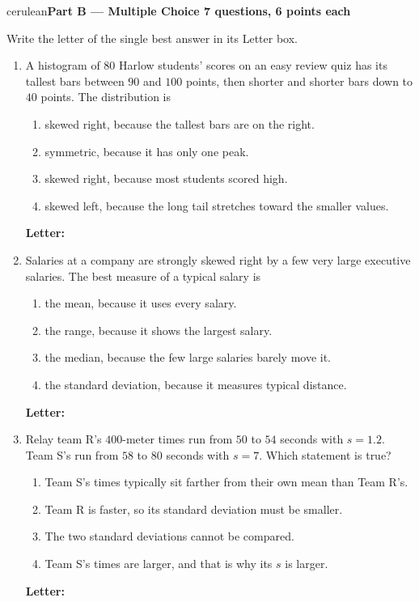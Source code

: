 \documentclass[10pt]{article}
\newcommand{\parthead}[1]{%
  \vspace{6pt}\noindent
  {\tcbset{after={\par\nopagebreak}}%
   \begin{headlinebox}{cerulean}{\color{white}\bfseries #1}\end{headlinebox}}%
  \nopagebreak\vspace{4pt}}
\begin{document}
\boxguard[8]
\parthead{Part B --- Multiple Choice \hfill 7 questions, 6 points each}

\small
Write the letter of the single best answer in its Letter box.
\begin{enumerate}[leftmargin=2.2em, itemsep=5pt, topsep=2pt, start=6]

\boxguard[9]
\item A histogram of $80$ Harlow students' scores on an easy review quiz has its tallest bars
between $90$ and $100$ points, then shorter and shorter bars down to $40$ points. The
distribution is
\begin{enumerate}[label=(\Alph*), leftmargin=1.8em, itemsep=1pt, topsep=1pt]
  \item skewed right, because the tallest bars are on the right.
  \item symmetric, because it has only one peak.
  \item skewed right, because most students scored high.
  \item skewed left, because the long tail stretches toward the smaller values.
\end{enumerate}
\hfill \textbf{Letter:} \gradedblank[id=q6, type=choice, points=6, answer={D}]{0.9cm}{11pt}

\boxguard[9]
\item Salaries at a company are strongly skewed right by a few very large executive salaries.
The best measure of a typical salary is
\begin{enumerate}[label=(\Alph*), leftmargin=1.8em, itemsep=1pt, topsep=1pt]
  \item the mean, because it uses every salary.
  \item the range, because it shows the largest salary.
  \item the median, because the few large salaries barely move it.
  \item the standard deviation, because it measures typical distance.
\end{enumerate}
\hfill \textbf{Letter:} \gradedblank[id=q7, type=choice, points=6, answer={C}]{0.9cm}{11pt}

\boxguard[9]
\item Relay team R's $400$-meter times run from $50$ to $54$ seconds with $s = 1.2$. Team S's
run from $58$ to $80$ seconds with $s = 7$. Which statement is true?
\begin{enumerate}[label=(\Alph*), leftmargin=1.8em, itemsep=1pt, topsep=1pt]
  \item Team S's times typically sit farther from their own mean than Team R's.
  \item Team R is faster, so its standard deviation must be smaller.
  \item The two standard deviations cannot be compared.
  \item Team S's times are larger, and that is why its $s$ is larger.
\end{enumerate}
\hfill \textbf{Letter:} \gradedblank[id=q8, type=choice, points=6, answer={A}]{0.9cm}{11pt}


\end{enumerate}
\end{document}

